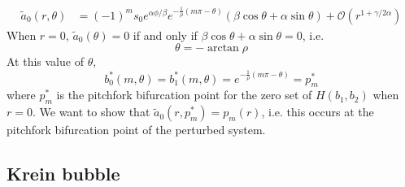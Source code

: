 \documentclass[thesis.tex]{subfiles}
\begin{document}
\begin{align*}
\tilde{a}_0(r, \theta)
&= (-1)^m s_0 e^{\alpha \phi/\beta} e^{-\frac{1}{\rho}(m \pi - \theta) } \left( \beta \cos \theta + \alpha \sin \theta \right) + \mathcal{O}(r^{1+\gamma/2\alpha}) 
\end{align*}
When $r = 0$, $\tilde{a}_0(\theta) = 0$ if and only if $\beta \cos \theta + \alpha \sin \theta = 0$, i.e.
\[
\theta = -\arctan \rho
\]
At this value of $\theta$,
\[
b_0^*(m, \theta) = b_1^*(m, \theta)= e^{-\frac{1}{\rho}(m \pi - \theta)} = p^*_m
\]
where $p^*_m$ is the pitchfork bifurcation point for the zero set of $H(b_1, b_2)$ when $r = 0$. We want to show that $\tilde{a}_0(r, p^*_m) = p_m(r)$, i.e. this occurs at the pitchfork bifurcation point of the perturbed system.

\subsection{Krein bubble}
\end{document}
